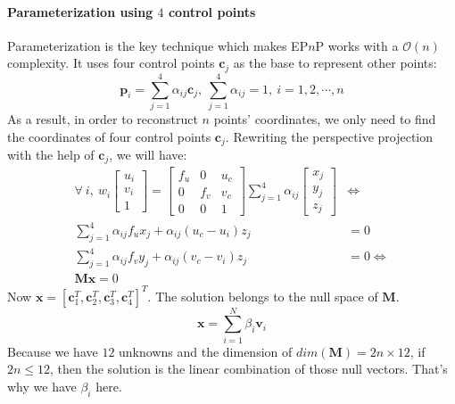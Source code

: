 \documentclass[a4paper]{article}
\begin{document}
\paragraph{Parameterization using $4$ control points}
Parameterization is the key technique which makes EP$n$P works with a $\mathcal{O}(n)$ complexity. It uses four control points $\mathbf{c}_j$ as the base to represent other points:
$$
\mathbf{p}_i=\sum_{j=1}^{4}\alpha_{ij}\mathbf{c}_j,\ \sum_{j=1}^{4}\alpha_{ij}=1,\ i=1,2,\cdots,n
$$
As a result, in order to reconstruct $n$ points' coordinates, we only need to find the coordinates of four control points $\mathbf{c}_j$. Rewriting the perspective projection with the help of $\mathbf{c}_j$, we will have:
\begin{align*}
\forall\ i,\ w_i\left[ \begin{matrix}
u_i \\ v_i \\ 1
\end{matrix} \right]=\left[
\begin{matrix}
f_u & 0 & u_c \\
0 & f_v & v_c \\
0 & 0 & 1
\end{matrix}
\right]
\sum_{j=1}^{4}\alpha_{ij}\left[
\begin{matrix}
x_j \\ y_j \\ z_j
\end{matrix}
\right] &\Leftrightarrow \\
\sum_{j=1}^{4}\alpha_{ij}f_ux_j+\alpha_{ij}(u_c-u_i)z_j&=0 \\
\sum_{j=1}^{4}\alpha_{ij}f_vy_j+\alpha_{ij}(v_c-v_i)z_j&=0 \Leftrightarrow \\
\mathbf{M}\mathbf{x}=0
\end{align*}
Now $\mathbf{x}=[\mathbf{c}_1^T,\mathbf{c}_2^T,\mathbf{c}_3^T,\mathbf{c}_4^T]^T$. The solution belongs to the null space of $\mathbf{M}$. 
$$
\mathbf{x}=\sum_{i=1}^{N}\beta_i \mathbf{v}_i
$$
Because we have $12$ unknowns and the dimension of $dim(\mathbf{M})=2n \times 12$, if $2n \leq 12$, then the solution is the linear combination of those null vectors. That's why we have $\beta_i$ here.
\end{document}
